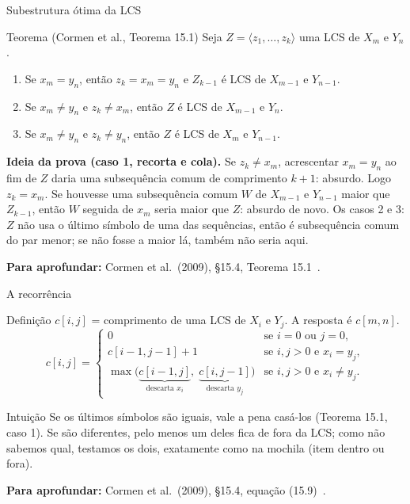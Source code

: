 \documentclass[aspectratio=169,xcolor=table]{beamer}
\newcommand{\fonte}[1]{%
  \vfill
  {\tiny\color{gray!55!black}\textbf{Para aprofundar:} #1\par}%
}
\begin{document}
\begin{frame}{Subestrutura ótima da LCS}
  \begin{block}{Teorema (Cormen et al., Teorema 15.1)}
    \scriptsize Seja $Z = \langle z_1,\dots,z_k\rangle$ uma LCS de $X_m$ e $Y_n$.
    \begin{enumerate}\scriptsize
      \item Se $x_m = y_n$, então $z_k = x_m = y_n$ e $Z_{k-1}$ é LCS de $X_{m-1}$ e
            $Y_{n-1}$.
      \item Se $x_m \ne y_n$ e $z_k \ne x_m$, então $Z$ é LCS de $X_{m-1}$ e $Y_n$.
      \item Se $x_m \ne y_n$ e $z_k \ne y_n$, então $Z$ é LCS de $X_m$ e $Y_{n-1}$.
    \end{enumerate}
  \end{block}
  \scriptsize\textbf{Ideia da prova (caso 1, recorta e cola).} Se $z_k \ne x_m$, acrescentar
  $x_m = y_n$ ao fim de $Z$ daria uma subsequência comum de comprimento $k+1$: absurdo.
  Logo $z_k = x_m$. Se houvesse uma subsequência comum $W$ de $X_{m-1}$ e $Y_{n-1}$ maior
  que $Z_{k-1}$, então $W$ seguida de $x_m$ seria maior que $Z$: absurdo de novo.
  Os casos 2 e 3: $Z$ não usa o último símbolo de uma das sequências, então é subsequência
  comum do par menor; se não fosse a maior lá, também não seria aqui.
  \fonte{Cormen et al.\ (2009), \S 15.4, Teorema 15.1~\cite{cormen2009introduction}.}
\end{frame}

\begin{frame}{A recorrência}
  \begin{block}{Definição}
    \scriptsize $c[i,j]$ = comprimento de uma LCS de $X_i$ e $Y_j$. A resposta é $c[m,n]$.
    \[
      c[i,j] =
      \begin{cases}
        0 & \text{se } i = 0 \text{ ou } j = 0,\\[2pt]
        c[i-1,j-1] + 1 & \text{se } i,j > 0 \text{ e } x_i = y_j,\\[2pt]
        \max\bigl(\underbrace{c[i-1,j]}_{\text{descarta } x_i},\;
                  \underbrace{c[i,j-1]}_{\text{descarta } y_j}\bigr)
          & \text{se } i,j > 0 \text{ e } x_i \ne y_j.
      \end{cases}
    \]
  \end{block}
  \begin{exampleblock}{Intuição}
    \scriptsize Se os últimos símbolos são iguais, vale a pena casá-los (Teorema 15.1, caso
    1). Se são diferentes, pelo menos um deles fica de fora da LCS; como não sabemos qual,
    testamos os dois, exatamente como na mochila (item dentro ou fora).
  \end{exampleblock}
  \fonte{Cormen et al.\ (2009), \S 15.4, equação (15.9)~\cite{cormen2009introduction}.}
\end{frame}
\end{document}
